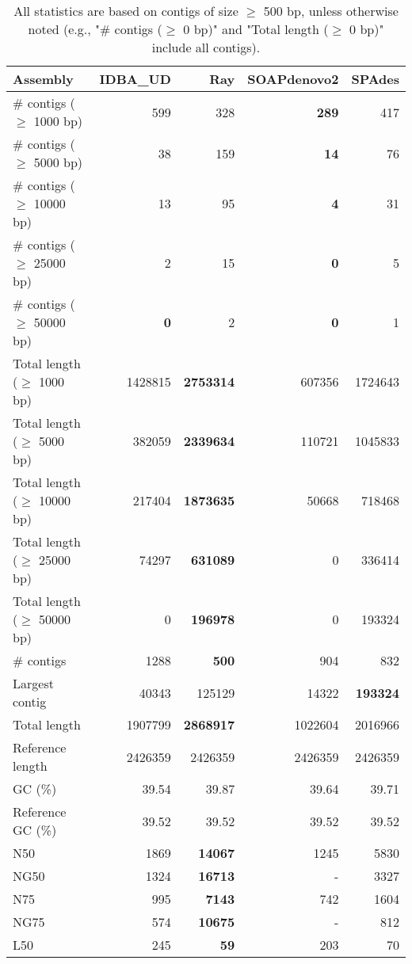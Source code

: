 \documentclass[12pt,a4paper]{article}
\begin{document}
\begin{table}[ht]
\begin{center}
\caption{All statistics are based on contigs of size $\geq$ 500 bp, unless otherwise noted (e.g., "\# contigs ($\geq$ 0 bp)" and "Total length ($\geq$ 0 bp)" include all contigs).}
\begin{tabular}{|l*{4}{|r}|}
\hline
Assembly & IDBA\_UD & Ray & SOAPdenovo2 & SPAdes \\ \hline
\# contigs ($\geq$ 1000 bp) & 599 & 328 & {\bf 289} & 417 \\ \hline
\# contigs ($\geq$ 5000 bp) & 38 & 159 & {\bf 14} & 76 \\ \hline
\# contigs ($\geq$ 10000 bp) & 13 & 95 & {\bf 4} & 31 \\ \hline
\# contigs ($\geq$ 25000 bp) & 2 & 15 & {\bf 0} & 5 \\ \hline
\# contigs ($\geq$ 50000 bp) & {\bf 0} & 2 & {\bf 0} & 1 \\ \hline
Total length ($\geq$ 1000 bp) & 1428815 & {\bf 2753314} & 607356 & 1724643 \\ \hline
Total length ($\geq$ 5000 bp) & 382059 & {\bf 2339634} & 110721 & 1045833 \\ \hline
Total length ($\geq$ 10000 bp) & 217404 & {\bf 1873635} & 50668 & 718468 \\ \hline
Total length ($\geq$ 25000 bp) & 74297 & {\bf 631089} & 0 & 336414 \\ \hline
Total length ($\geq$ 50000 bp) & 0 & {\bf 196978} & 0 & 193324 \\ \hline
\# contigs & 1288 & {\bf 500} & 904 & 832 \\ \hline
Largest contig & 40343 & 125129 & 14322 & {\bf 193324} \\ \hline
Total length & 1907799 & {\bf 2868917} & 1022604 & 2016966 \\ \hline
Reference length & 2426359 & 2426359 & 2426359 & 2426359 \\ \hline
GC (\%) & 39.54 & 39.87 & 39.64 & 39.71 \\ \hline
Reference GC (\%) & 39.52 & 39.52 & 39.52 & 39.52 \\ \hline
N50 & 1869 & {\bf 14067} & 1245 & 5830 \\ \hline
NG50 & 1324 & {\bf 16713} & - & 3327 \\ \hline
N75 & 995 & {\bf 7143} & 742 & 1604 \\ \hline
NG75 & 574 & {\bf 10675} & - & 812 \\ \hline
L50 & 245 & {\bf 59} & 203 & 70 \\ \hline

\end{tabular}
\end{center}
\end{table}
\end{document}
